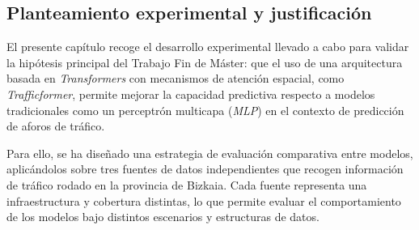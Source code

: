 \subsection{Planteamiento experimental y justificación}
\label{sec:planteamiento_experimental}

El presente capítulo recoge el desarrollo experimental llevado a cabo para validar la hipótesis principal del Trabajo Fin de Máster: que el uso de una arquitectura basada en \textit{Transformers} con mecanismos de atención espacial, como \textit{Trafficformer}, permite mejorar la capacidad predictiva respecto a modelos tradicionales como un perceptrón multicapa (\textit{MLP}) en el contexto de predicción de aforos de tráfico.

Para ello, se ha diseñado una estrategia de evaluación comparativa entre modelos, aplicándolos sobre tres fuentes de datos independientes que recogen información de tráfico rodado en la provincia de Bizkaia. Cada fuente representa una infraestructura y cobertura distintas, lo que permite evaluar el comportamiento de los modelos bajo distintos escenarios y estructuras de datos.


